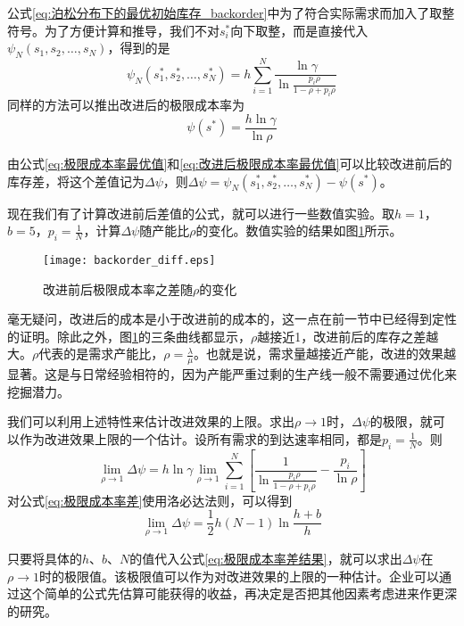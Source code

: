 公式\ref{eq:泊松分布下的最优初始库存_backorder}中为了符合实际需求而加入了取整符号。为了方便计算和推导，我们不对$s_i^*$向下取整，而是直接代入$\psi_N(s_1,s_2,\ldots,s_N)$，得到的是
\begin{equation}
\psi_N(s_1^*,s_2^*,\ldots,s_N^*) = h\sum_{i=1}^N\frac{\ln\gamma}{\ln\frac{p_i\rho}{1-\rho+p_i\rho}}
\label{eq:极限成本率最优值}
\end{equation}
同样的方法可以推出改进后的极限成本率为
\begin{equation}
\psi(s^*) = \frac{h\ln\gamma}{\ln\rho}
\label{eq:改进后极限成本率最优值}
\end{equation}

由公式\ref{eq:极限成本率最优值}和\ref{eq:改进后极限成本率最优值}可以比较改进前后的库存差，将这个差值记为$\Delta\psi$，则$\Delta\psi=\psi_N(s_1^*,s_2^*,\ldots,s_N^*)-\psi(s^*)$。

现在我们有了计算改进前后差值的公式，就可以进行一些数值实验。取$h=1$，$b=5$，$p_i=\frac{1}{N}$，计算$\Delta\psi$随产能比$\rho$的变化。数值实验的结果如图\ref{fig:改进前后极限成本率之差}所示。

\begin{figure}[htbp]
\centering
\texttt{[image: backorder\_diff.eps]}
\caption{改进前后极限成本率之差随$\rho$的变化}
\label{fig:改进前后极限成本率之差}
\end{figure}

毫无疑问，改进后的成本是小于改进前的成本的，这一点在前一节中已经得到定性的证明。除此之外，图\ref{fig:改进前后极限成本率之差}的三条曲线都显示，$\rho$越接近1，改进前后的库存之差越大。$\rho$代表的是需求产能比，$\rho = \frac{\lambda}{\mu}$。也就是说，需求量越接近产能，改进的效果越显著。这是与日常经验相符的，因为产能严重过剩的生产线一般不需要通过优化来挖掘潜力。

我们可以利用上述特性来估计改进效果的上限。求出$\rho \to 1$时，$\Delta\psi$的极限，就可以作为改进效果上限的一个估计。设所有需求的到达速率相同，都是$p_i=\frac{1}{N}$。则
\begin{equation}
\lim_{\rho\to 1}\Delta\psi = h\ln\gamma\lim_{\rho\to 1}\sum_{i=1}^N\left[\frac{1}{\ln\frac{p_i\rho}{1-\rho+p_i\rho}}-\frac{p_i}{\ln\rho}\right]
\label{eq:极限成本率差}
\end{equation}
对公式\ref{eq:极限成本率差}使用洛必达法则，可以得到
\begin{equation}
\lim_{\rho\to 1}\Delta\psi = \frac{1}{2}h(N-1)\ln\frac{h+b}{h}
\label{eq:极限成本率差结果}
\end{equation}

只要将具体的$h$、$b$、$N$的值代入公式\ref{eq:极限成本率差结果}，就可以求出$\Delta\psi$在$\rho \to 1$时的极限值。该极限值可以作为对改进效果的上限的一种估计。企业可以通过这个简单的公式先估算可能获得的收益，再决定是否把其他因素考虑进来作更深的研究。





